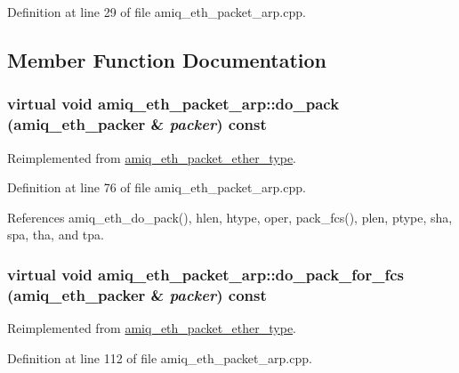Definition at line 29 of file amiq\_\-eth\_\-packet\_\-arp.cpp.

\subsection{Member Function Documentation}
\hypertarget{classamiq__eth__packet__arp_aa0919231910bf804ffafd9b1b771785f}{
\subsubsection[{do\_\-pack}]{\setlength{\rightskip}{0pt plus 5cm}virtual void amiq\_\-eth\_\-packet\_\-arp::do\_\-pack ({\bf amiq\_\-eth\_\-packer} \& {\em packer}) const}}
\label{classamiq__eth__packet__arp_aa0919231910bf804ffafd9b1b771785f}


Reimplemented from \hyperlink{classamiq__eth__packet__ether__type_a62fe5f26a466f0bd0045599b89aa6926}{amiq\_\-eth\_\-packet\_\-ether\_\-type}.

Definition at line 76 of file amiq\_\-eth\_\-packet\_\-arp.cpp.

References amiq\_\-eth\_\-do\_\-pack(), hlen, htype, oper, pack\_\-fcs(), plen, ptype, sha, spa, tha, and tpa.\hypertarget{classamiq__eth__packet__arp_aa94e012455f436aa874eb6e27e02b5fa}{
\subsubsection[{do\_\-pack\_\-for\_\-fcs}]{\setlength{\rightskip}{0pt plus 5cm}virtual void amiq\_\-eth\_\-packet\_\-arp::do\_\-pack\_\-for\_\-fcs ({\bf amiq\_\-eth\_\-packer} \& {\em packer}) const}}
\label{classamiq__eth__packet__arp_aa94e012455f436aa874eb6e27e02b5fa}


Reimplemented from \hyperlink{classamiq__eth__packet__ether__type_aaa85cf778650e1c1b377392a975cb7bc}{amiq\_\-eth\_\-packet\_\-ether\_\-type}.

Definition at line 112 of file amiq\_\-eth\_\-packet\_\-arp.cpp.

